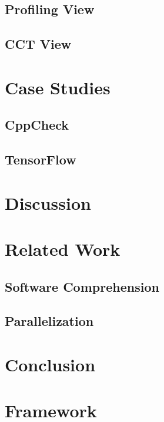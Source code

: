 \documentclass[conference]{IEEEtran}
\begin{document}
\subsection{Profiling View}
\label{sec:profiling_view}

\subsection{CCT View}
\label{cct_view}

\section{Case Studies}
\label{sec:case_studies}

\subsection{CppCheck}
\label{sec:cppcheck}

\subsection{TensorFlow}
\label{sec:tensorflow}

\section{Discussion}
\label{sec:discussion}

\section{Related Work}
\label{sec:related_work}

\subsection{Software Comprehension}
\label{sec:software_comprehension}

\subsection{Parallelization}
\label{sec:related_work_parallelization}

\section{Conclusion}
\label{sec:conclusion}

\section{Framework}
\end{document}
